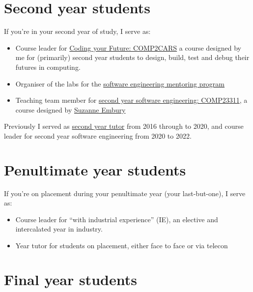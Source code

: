 \documentclass[
  12pt,
]{book}
\providecommand{\tightlist}{%
  \setlength{\itemsep}{0pt}\setlength{\parskip}{0pt}}
\begin{document}
\hypertarget{year2}{%
\section{Second year students}\label{year2}}

If you're in your second year of study, I serve as:

\begin{itemize}
\tightlist
\item
  Course leader for \href{https://www.cdyf.me/}{Coding your Future: COMP2CARS} a course designed by me for (primarily) second year students to design, build, test and debug their futures in computing.
\item
  Organiser of the labs for the \href{https://www.cs.manchester.ac.uk/connect/business-engagement/industrial-mentoring/}{software engineering mentoring program}
\item
  Teaching team member for \href{https://studentnet.cs.manchester.ac.uk/ugt/COMP23311/syllabus/}{second year software engineering: COMP23311}, a course designed by \href{http://www.cs.man.ac.uk/~embury/}{Suzanne Embury} \citep{COMP23311, git}
\end{itemize}

Previously I served as \href{https://studentnet.cs.manchester.ac.uk/ugt/year2/}{second year tutor} from 2016 through to 2020, and course leader for second year software engineering from 2020 to 2022.

\hypertarget{penultimate}{%
\section{Penultimate year students}\label{penultimate}}

If you're on placement during your penultimate year (your last-but-one), I serve as:

\begin{itemize}
\tightlist
\item
  Course leader for ``with industrial experience'' (IE), an elective and intercalated year in industry.
\item
  Year tutor for students on placement, either face to face or via telecon
\end{itemize}

\hypertarget{finalyear}{%
\section{Final year students}\label{finalyear}}
\end{document}
